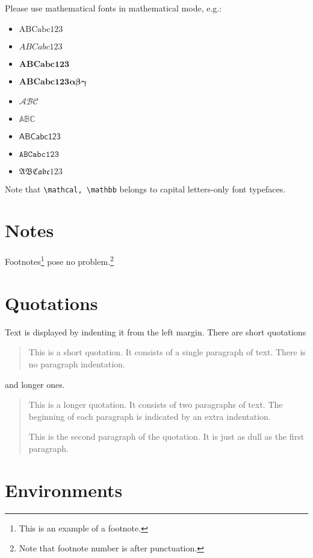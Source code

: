 \documentclass[aoas]{imsart}
\numberwithin{equation}{section}
\theoremstyle{plain}
\theoremstyle{remark}
\begin{document}
Please use mathematical fonts in mathematical mode, e.g.:

\begin{itemize}
\item[] $\mathrm{ABCabc123}$
\item[] $\mathit{ABCabc123}$
\item[] $\mathbf{ABCabc123}$
\item[] $\boldsymbol{ABCabc123\alpha\beta\gamma}$
\item[] $\mathcal{ABC}$
\item[] $\mathbb{ABC}$
\item[] $\mathsf{ABCabc123}$
\item[] $\mathtt{ABCabc123}$
\item[] $\mathfrak{ABCabc123}$
\end{itemize}

Note that \verb|\mathcal, \mathbb| belongs to capital letters-only font
typefaces.

\hypertarget{notes}{%
\section{Notes}\label{notes}}

Footnotes\footnote{This is an example of a footnote.} pose no
problem.\footnote{Note that footnote number is after punctuation.}

\hypertarget{quotations}{%
\section{Quotations}\label{quotations}}

Text is displayed by indenting it from the left margin. There are short
quotations

\begin{quote}
This is a short quotation. It consists of a single paragraph of text.
There is no paragraph indentation.
\end{quote}

and longer ones.

\begin{quotation}
This is a longer quotation. It consists of two paragraphs of text. The
beginning of each paragraph is indicated by an extra indentation.

This is the second paragraph of the quotation. It is just as dull as the
first paragraph.

\end{quotation}

\hypertarget{environments}{%
\section{Environments}\label{environments}}
\end{document}
